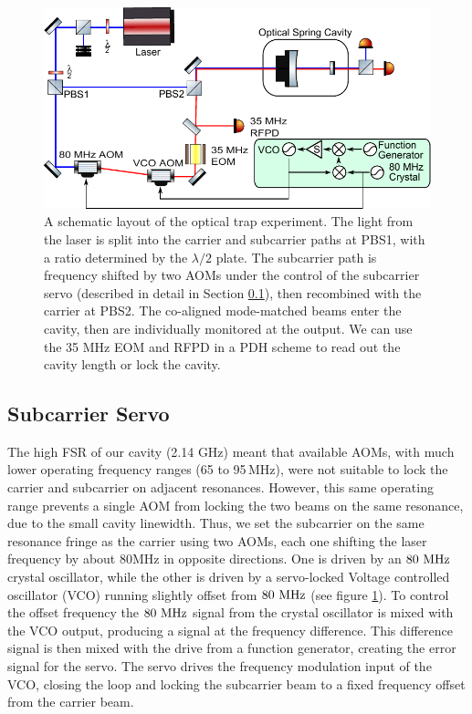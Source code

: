 \begin{figure}[htb]%
\centering
\includegraphics[width=\columnwidth]{figures/photothermal/layout3}%
\caption[A schematic layout of the optical trap experiment]{A schematic layout of the optical trap experiment. The light from the laser is split into the carrier and subcarrier paths at PBS1, with a ratio determined by the $\lambda/2$ plate. The subcarrier path is frequency shifted by two AOMs under the control of the subcarrier servo (described in detail in Section \ref{sec:subservo}), then recombined with the carrier at PBS2. The co-aligned mode-matched beams enter the cavity, then are individually monitored at the output. We can use the 35 MHz EOM and RFPD in a PDH scheme to read out the cavity length or lock the cavity.}
\label{fig:layout}
\end{figure}


\subsection{Subcarrier Servo}
\label{sec:subservo}

The high FSR of our cavity (2.14 GHz) meant that available AOMs, with much lower operating frequency ranges (65 to 95$\,$MHz), were not suitable to lock the carrier and subcarrier on adjacent resonances.  
However, this same operating range prevents a single AOM from locking the two beams on the same resonance, due to the small cavity linewidth.
%
%
Thus, we set the subcarrier on the same resonance fringe as the carrier using two AOMs, each one shifting the laser frequency by about 80MHz in opposite directions.
One is driven by an $80~{\rm MHz}$ crystal oscillator, while the other is driven by a servo-locked Voltage controlled oscillator (VCO) running slightly offset from $80~{\rm MHz}$ (see figure \ref{fig:layout}).
To control the offset frequency the $80~{\rm MHz}$ signal from the crystal oscillator is mixed with the VCO output, producing a signal at the frequency difference. This difference signal is then mixed with the drive from a function generator, creating the error signal for the servo.  The servo drives the frequency modulation input of the VCO, closing the loop and locking the subcarrier beam to a fixed frequency offset from the carrier beam.


